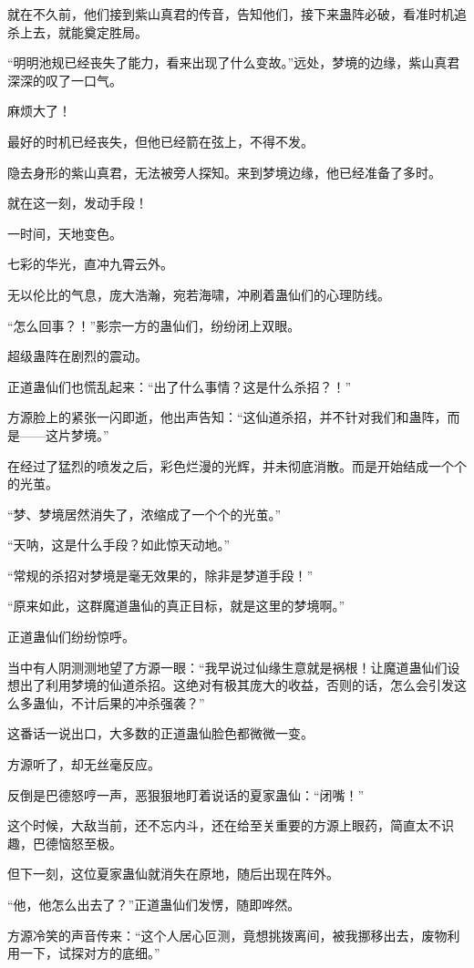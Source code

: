 \begin{this_body}
就在不久前，他们接到紫山真君的传音，告知他们，接下来蛊阵必破，看准时机追杀上去，就能奠定胜局。

“明明池规已经丧失了能力，看来出现了什么变故。”远处，梦境的边缘，紫山真君深深的叹了一口气。

麻烦大了！

最好的时机已经丧失，但他已经箭在弦上，不得不发。

隐去身形的紫山真君，无法被旁人探知。来到梦境边缘，他已经准备了多时。

就在这一刻，发动手段！

一时间，天地变色。

七彩的华光，直冲九霄云外。

无以伦比的气息，庞大浩瀚，宛若海啸，冲刷着蛊仙们的心理防线。

“怎么回事？！”影宗一方的蛊仙们，纷纷闭上双眼。

超级蛊阵在剧烈的震动。

正道蛊仙们也慌乱起来：“出了什么事情？这是什么杀招？！”

方源脸上的紧张一闪即逝，他出声告知：“这仙道杀招，并不针对我们和蛊阵，而是——这片梦境。”

在经过了猛烈的喷发之后，彩色烂漫的光辉，并未彻底消散。而是开始结成一个个的光茧。

“梦、梦境居然消失了，浓缩成了一个个的光茧。”

“天呐，这是什么手段？如此惊天动地。”

“常规的杀招对梦境是毫无效果的，除非是梦道手段！”

“原来如此，这群魔道蛊仙的真正目标，就是这里的梦境啊。”

正道蛊仙们纷纷惊呼。

当中有人阴测测地望了方源一眼：“我早说过仙缘生意就是祸根！让魔道蛊仙们设想出了利用梦境的仙道杀招。这绝对有极其庞大的收益，否则的话，怎么会引发这么多蛊仙，不计后果的冲杀强袭？”

这番话一说出口，大多数的正道蛊仙脸色都微微一变。

方源听了，却无丝毫反应。

反倒是巴德怒哼一声，恶狠狠地盯着说话的夏家蛊仙：“闭嘴！”

这个时候，大敌当前，还不忘内斗，还在给至关重要的方源上眼药，简直太不识趣，巴德恼怒至极。

但下一刻，这位夏家蛊仙就消失在原地，随后出现在阵外。

“他，他怎么出去了？”正道蛊仙们发愣，随即哗然。

方源冷笑的声音传来：“这个人居心叵测，竟想挑拨离间，被我挪移出去，废物利用一下，试探对方的底细。”


\end{this_body}
